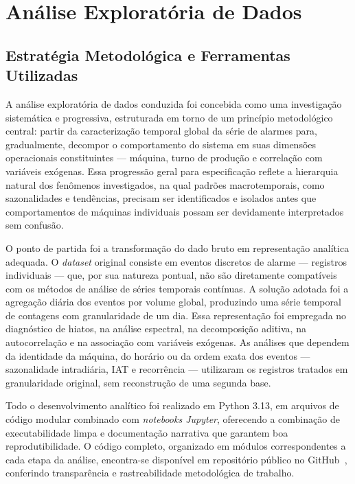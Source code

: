 \section{Análise Exploratória de Dados}
\label{sec:eda}

\subsection{Estratégia Metodológica e Ferramentas Utilizadas}

A análise exploratória de dados conduzida foi concebida como uma investigação sistemática e progressiva, estruturada em torno de um princípio metodológico central: partir da caracterização temporal global da série de alarmes para, gradualmente, decompor o comportamento do sistema em suas dimensões operacionais constituintes --- máquina, turno de produção e correlação com variáveis exógenas. Essa progressão geral para especificação reflete a hierarquia natural dos fenômenos investigados, na qual padrões macrotemporais, como sazonalidades e tendências, precisam ser identificados e isolados antes que comportamentos de máquinas individuais possam ser devidamente interpretados sem confusão.

O ponto de partida foi a transformação do dado bruto em representação analítica adequada. O \textit{dataset} original consiste em eventos discretos de alarme --- registros individuais --- que, por sua natureza pontual, não são diretamente compatíveis com os métodos de análise de séries temporais contínuas. A solução adotada foi a agregação diária dos eventos por volume global, produzindo uma série temporal de contagens com granularidade de um dia. Essa representação foi empregada no diagnóstico de hiatos, na análise espectral, na decomposição aditiva, na autocorrelação e na associação com variáveis exógenas. As análises que dependem da identidade da máquina, do horário ou da ordem exata dos eventos --- sazonalidade intradiária, IAT e recorrência --- utilizaram os registros tratados em granularidade original, sem reconstrução de uma segunda base.

Todo o desenvolvimento analítico foi realizado em Python 3.13, em arquivos de código modular combinado com \textit{notebooks Jupyter}, oferecendo a combinação de executabilidade limpa e documentação narrativa que garantem boa reprodutibilidade. O código completo, organizado em módulos correspondentes a cada etapa da análise, encontra-se disponível em repositório público no GitHub~\cite{gpam_manufacturing_alarms}, conferindo transparência e rastreabilidade metodológica de trabalho.

